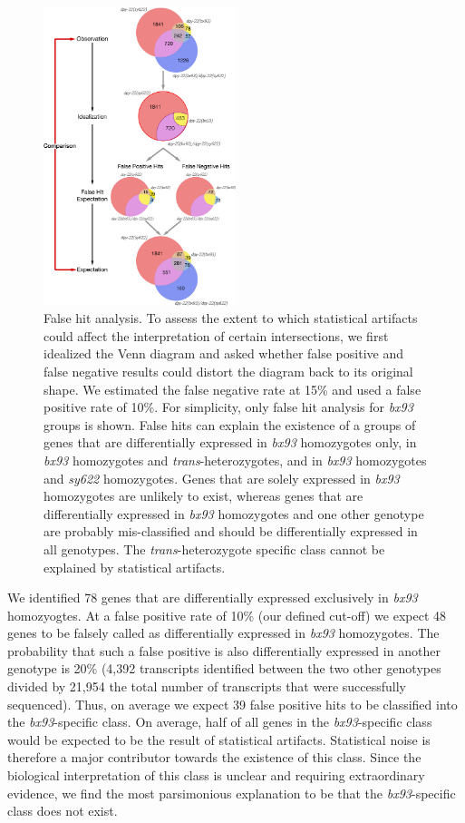 \documentclass[10pt, twocolumn]{article}
\begin{document}
\begin{figure}
  \includegraphics[width=0.5\textwidth]{../figs/false_hit_analysis.pdf}
  \caption{False hit analysis. To assess the extent to which statistical
  artifacts could affect the interpretation of certain intersections, we
  first idealized the Venn diagram and asked whether false positive and
  false negative results could distort the diagram back to its original
  shape. We estimated the false negative rate at 15\% and used a false positive
  rate of 10\%. For simplicity, only false hit analysis for \emph{bx93} groups
  is shown. False hits can explain the existence of a groups of genes that
  are differentially expressed in \emph{bx93} homozygotes only, in \emph{bx93}
  homozygotes and \emph{trans}-heterozygotes, and in \emph{bx93} homozygotes
  and \emph{sy622} homozygotes. Genes that are solely expressed in \emph{bx93}
  homozygotes are unlikely to exist, whereas genes that are differentially
  expressed in \emph{bx93} homozygotes and one other genotype are probably
  mis-classified and should be differentially expressed in all genotypes. The
  \emph{trans}-heterozygote specific class cannot be explained by statistical
  artifacts.
  }
\label{fig:false_hit}
\end{figure}

We identified 78 genes that are differentially expressed
exclusively in \emph{bx93} homozyogtes. At a false positive rate of 10\% (our
defined cut-off) we expect 48 genes to be falsely called as differentially
expressed in \emph{bx93} homozygotes. The probability that such a false positive
is also differentially expressed in another genotype is 20\% (4,392 transcripts
identified between the two other genotypes divided by 21,954 the total number of
transcripts that were successfully sequenced). Thus, on average we expect 39
false positive hits to be classified into the \emph{bx93}-specific class.
On average, half of all genes in the \emph{bx93}-specific class would be expected to be the
result of statistical artifacts. Statistical noise is therefore a major contributor towards the
existence of this class. Since the biological interpretation of this class
is unclear and requiring extraordinary evidence, we find the most parsimonious
explanation to be that the \emph{bx93}-specific class does not exist.
\end{document}
